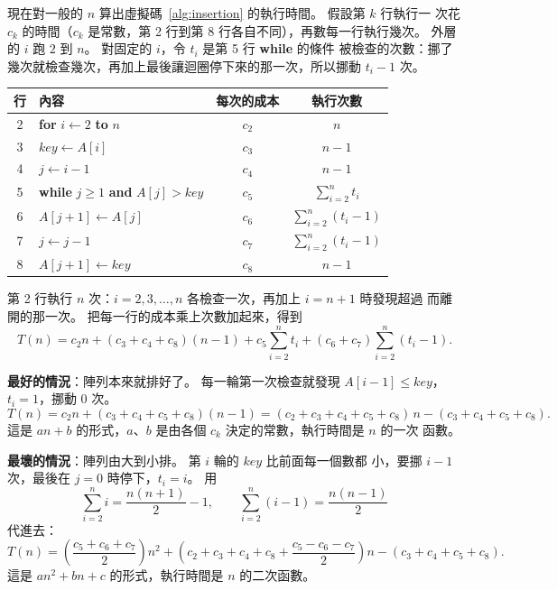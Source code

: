 現在對一般的 $n$ 算出虛擬碼~\ref{alg:insertion} 的執行時間。 假設第 $k$ 行執行一
次花 $c_k$ 的時間（$c_k$ 是常數，第 2 行到第 8 行各自不同），再數每一行執行幾次。
外層的 $i$ 跑 $2$ 到 $n$。 對固定的 $i$，令 $t_i$ 是第 5 行 \textbf{while} 的條件
被檢查的次數：挪了幾次就檢查幾次，再加上最後讓迴圈停下來的那一次，所以挪動
$t_i - 1$ 次。

\begin{center}
\begin{tabular}{clcc}
\toprule
行 & 內容 & 每次的成本 & 執行次數 \\
\midrule
2 & \textbf{for} $i \gets 2$ \textbf{to} $n$ & $c_2$ & $n$ \\
3 & $\mathit{key} \gets A[i]$ & $c_3$ & $n - 1$ \\
4 & $j \gets i - 1$ & $c_4$ & $n - 1$ \\
5 & \textbf{while} $j \ge 1$ \textbf{and} $A[j] > \mathit{key}$ & $c_5$ &
$\sum_{i=2}^{n} t_i$ \\
6 & $A[j + 1] \gets A[j]$ & $c_6$ & $\sum_{i=2}^{n} (t_i - 1)$ \\
7 & $j \gets j - 1$ & $c_7$ & $\sum_{i=2}^{n} (t_i - 1)$ \\
8 & $A[j + 1] \gets \mathit{key}$ & $c_8$ & $n - 1$ \\
\bottomrule
\end{tabular}
\end{center}

第 2 行執行 $n$ 次：$i = 2, 3, \ldots, n$ 各檢查一次，再加上 $i = n + 1$ 時發現超過
而離開的那一次。 把每一行的成本乘上次數加起來，得到
\[
T(n) = c_2 n + (c_3 + c_4 + c_8)(n - 1) + c_5 \sum_{i=2}^{n} t_i
+ (c_6 + c_7) \sum_{i=2}^{n} (t_i - 1).
\]

\textbf{最好的情況}：陣列本來就排好了。 每一輪第一次檢查就發現 $A[i-1] \le
\mathit{key}$，$t_i = 1$，挪動 $0$ 次。
\[
T(n) = c_2 n + (c_3 + c_4 + c_5 + c_8)(n - 1) = (c_2 + c_3 + c_4 + c_5 + c_8)\, n
- (c_3 + c_4 + c_5 + c_8).
\]
這是 $an + b$ 的形式，$a$、$b$ 是由各個 $c_k$ 決定的常數，執行時間是 $n$ 的一次
函數。

\textbf{最壞的情況}：陣列由大到小排。 第 $i$ 輪的 $\mathit{key}$ 比前面每一個數都
小，要挪 $i - 1$ 次，最後在 $j = 0$ 時停下，$t_i = i$。 用
\[
\sum_{i=2}^{n} i = \frac{n(n+1)}{2} - 1, \qquad
\sum_{i=2}^{n} (i - 1) = \frac{n(n-1)}{2}
\]
代進去：
\[
T(n) = \left(\frac{c_5 + c_6 + c_7}{2}\right) n^2
+ \left(c_2 + c_3 + c_4 + c_8 + \frac{c_5 - c_6 - c_7}{2}\right) n
- (c_3 + c_4 + c_5 + c_8).
\]
這是 $an^2 + bn + c$ 的形式，執行時間是 $n$ 的二次函數。

